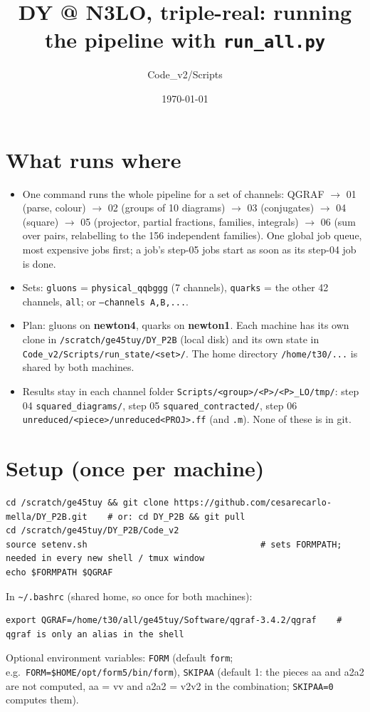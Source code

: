 \documentclass[10pt]{article}
\title{DY @ N3LO, triple-real: running the pipeline with \texttt{run\_all.py}}
\author{Code\_v2/Scripts}
\date{\today}
\newcommand{\cmd}[1]{\texttt{#1}}
\begin{document}
\maketitle
\tableofcontents

\section{What runs where}
\begin{itemize}
\item One command runs the whole pipeline for a set of channels: QGRAF $\to$ 01 (parse, colour) $\to$ 02 (groups of
  10 diagrams) $\to$ 03 (conjugates) $\to$ 04 (square) $\to$ 05 (projector, partial fractions, families, integrals)
  $\to$ 06 (sum over pairs, relabelling to the 156 independent families). One global job queue, most expensive jobs
  first; a job's step-05 jobs start as soon as its step-04 job is done.
\item Sets: \cmd{gluons} = \cmd{physical\_qqbggg} (7 channels), \cmd{quarks} = the other 42 channels, \cmd{all};
  or \cmd{--channels A,B,...}.
\item Plan: gluons on \textbf{newton4}, quarks on \textbf{newton1}. Each machine has its own clone in
  \cmd{/scratch/ge45tuy/DY\_P2B} (local disk) and its own state in \cmd{Code\_v2/Scripts/run\_state/<set>/}.
  The home directory \cmd{/home/t30/...} is shared by both machines.
\item Results stay in each channel folder \cmd{Scripts/<group>/<P>/<P>\_LO/tmp/}: step 04
  \cmd{squared\_diagrams/}, step 05 \cmd{squared\_contracted/}, step 06 \cmd{unreduced/<piece>/unreduced<PROJ>.ff}
  (and \cmd{.m}). None of these is in git.
\end{itemize}

\section{Setup (once per machine)}
\begin{lstlisting}
cd /scratch/ge45tuy && git clone https://github.com/cesarecarlo-mella/DY_P2B.git    # or: cd DY_P2B && git pull
cd /scratch/ge45tuy/DY_P2B/Code_v2
source setenv.sh                                  # sets FORMPATH; needed in every new shell / tmux window
echo $FORMPATH $QGRAF
\end{lstlisting}
In \cmd{\textasciitilde/.bashrc} (shared home, so once for both machines):
\begin{lstlisting}
export QGRAF=/home/t30/all/ge45tuy/Software/qgraf-3.4.2/qgraf    # qgraf is only an alias in the shell
\end{lstlisting}
Optional environment variables: \cmd{FORM} (default \cmd{form}; e.g.\ \cmd{FORM=\$HOME/opt/form5/bin/form}),
\cmd{SKIPAA} (default 1: the pieces aa and a2a2 are not computed, aa = vv and a2a2 = v2v2 in the combination;
\cmd{SKIPAA=0} computes them).
\end{document}
